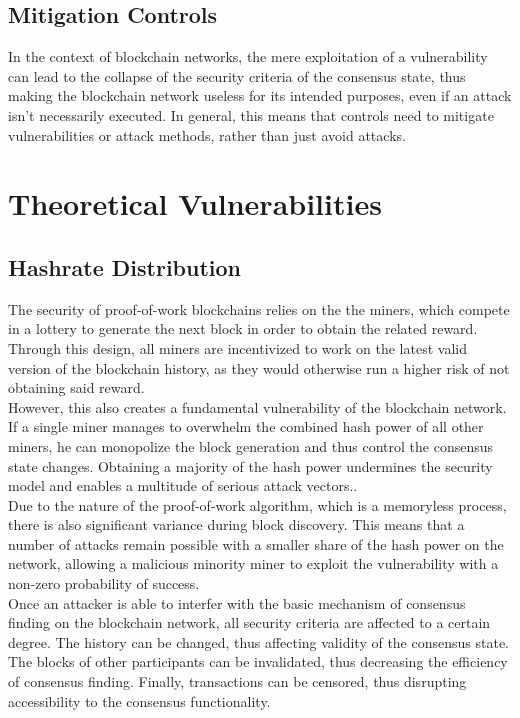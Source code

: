 \documentclass[12pt,a4paper]{article}
\begin{document}
\subsection{Mitigation Controls}

In the context of blockchain networks, the mere exploitation of a vulnerability can lead to the collapse of the security criteria of the consensus state, thus making the blockchain network useless for its intended purposes, even if an attack isn't necessarily executed. In general, this means that controls need to mitigate vulnerabilities or attack methods, rather than just avoid attacks.\\

\section{Theoretical Vulnerabilities}

\subsection{Hashrate Distribution}

The security of proof-of-work blockchains relies on the the miners, which compete in a lottery to generate the next block in order to obtain the related reward. Through this design, all miners are incentivized to work on the latest valid version of the blockchain history, as they would otherwise run a higher risk of not obtaining said reward.\\

However, this also creates a fundamental vulnerability of the blockchain network. If a single miner manages to overwhelm the combined hash power of all other miners, he can monopolize the block generation and thus control the consensus state changes. Obtaining a majority of the hash power undermines the security model and enables a multitude of serious attack vectors..\\

Due to the nature of the proof-of-work algorithm, which is a memoryless process, there is also significant variance during block discovery. This means that a number of attacks remain possible with a smaller share of the hash power on the network, allowing a malicious minority miner to exploit the vulnerability with a non-zero probability of success.\\

Once an attacker is able to interfer with the basic mechanism of consensus finding on the blockchain network, all security criteria are affected to a certain degree. The history can be changed, thus affecting validity of the consensus state. The blocks of other participants can be invalidated, thus decreasing the efficiency of consensus finding. Finally, transactions can be censored, thus disrupting accessibility to the consensus functionality.\\
\end{document}
